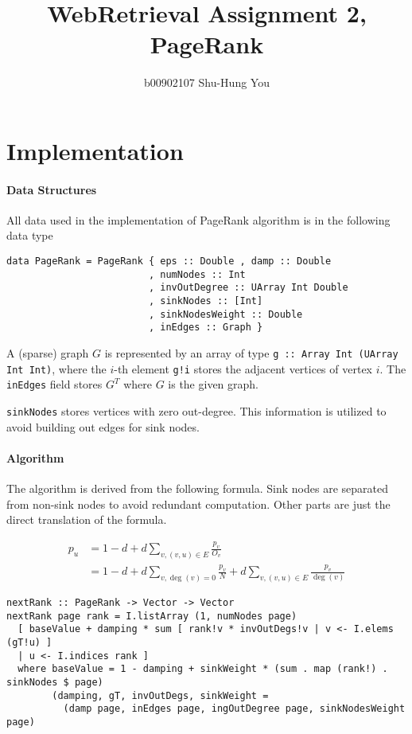 \documentclass{article}
\begin{document}
\title{WebRetrieval Assignment 2, PageRank}
\date{}
\author{b00902107 Shu-Hung You}
\maketitle
\section{Implementation}
\paragraph{Data Structures} All data used in the implementation of
PageRank algorithm is in the following data type

\begin{verbatim}
data PageRank = PageRank { eps :: Double , damp :: Double
                         , numNodes :: Int
                         , invOutDegree :: UArray Int Double
                         , sinkNodes :: [Int]
                         , sinkNodesWeight :: Double
                         , inEdges :: Graph }
\end{verbatim}

A (sparse) graph $G$ is represented by an array of type
\texttt{g :: Array Int (UArray Int Int)}, where the $i$-th element \texttt{g!i}
stores the adjacent vertices of vertex $i$. The \texttt{inEdges} field stores
$G^T$ where $G$ is the given graph.

\texttt{sinkNodes} stores vertices with zero out-degree. This information is
utilized to avoid building out edges for sink nodes.

\paragraph{Algorithm} The algorithm is derived from the following formula.
Sink nodes are separated from non-sink nodes to avoid redundant computation.
Other parts are just the direct translation of the formula.

\[\begin{aligned}
p_u
&= 1-d + d\sum_{v,(v,u)\in E}\frac{p_v}{O_v} \\
&= 1-d + d\sum_{v,\deg(v)=0}\frac{p_v}{N} + d\sum_{v,(v,u)\in E}\frac{p_v}{\deg(v)}
\end{aligned}\]

\begin{verbatim}
nextRank :: PageRank -> Vector -> Vector
nextRank page rank = I.listArray (1, numNodes page)
  [ baseValue + damping * sum [ rank!v * invOutDegs!v | v <- I.elems (gT!u) ]
  | u <- I.indices rank ]
  where baseValue = 1 - damping + sinkWeight * (sum . map (rank!) . sinkNodes $ page)
        (damping, gT, invOutDegs, sinkWeight =
          (damp page, inEdges page, ingOutDegree page, sinkNodesWeight page)
\end{verbatim}
\end{document}
